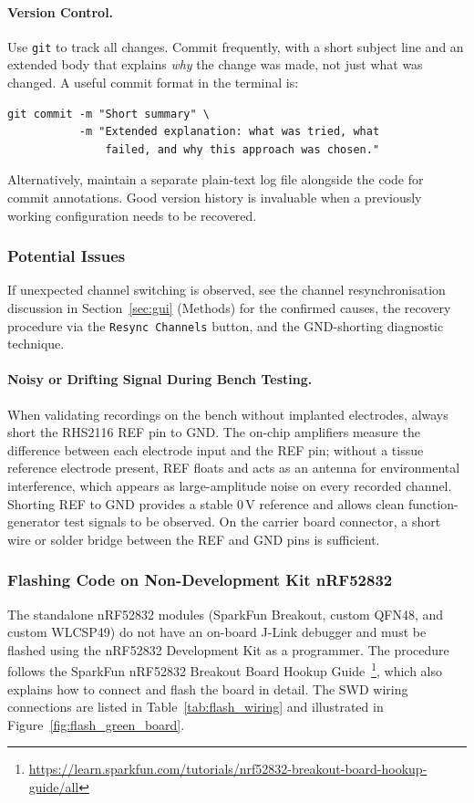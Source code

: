 \paragraph{Version Control.}
Use \texttt{git} to track all changes. Commit frequently, with a short subject line
and an extended body that explains \emph{why} the change was made, not just what
was changed. A useful commit format in the terminal is:
\begin{lstlisting}[numbers=none,frame=none]
git commit -m "Short summary" \
           -m "Extended explanation: what was tried, what
               failed, and why this approach was chosen."
\end{lstlisting}
Alternatively, maintain a separate plain-text log file alongside the code for
commit annotations. Good version history is invaluable when a previously working
configuration needs to be recovered.

\subsubsection{Potential Issues}
If unexpected channel switching is observed, see the channel resynchronisation
discussion in Section~\ref{sec:gui} (Methods) for the confirmed causes, the
recovery procedure via the \texttt{Resync Channels} button, and the GND-shorting
diagnostic technique.

\paragraph{Noisy or Drifting Signal During Bench Testing.}
When validating recordings on the bench without implanted electrodes, always
short the RHS2116 REF pin to GND. The on-chip amplifiers measure the difference
between each electrode input and the REF pin; without a tissue reference
electrode present, REF floats and acts as an antenna for environmental
interference, which appears as large-amplitude noise on every recorded channel.
Shorting REF to GND provides a stable 0\,V reference and allows clean
function-generator test signals to be observed. On the carrier board connector,
a short wire or solder bridge between the REF and GND pins is sufficient.

\subsubsection{Flashing Code on Non-Development Kit nRF52832}
\label{app:flash_ndk}

The standalone nRF52832 modules (SparkFun Breakout, custom QFN48, and custom WLCSP49)
do not have an on-board J-Link debugger and must be flashed using the nRF52832
Development Kit as a programmer. The procedure follows the SparkFun nRF52832 Breakout
Board Hookup Guide~\cite{sparkfun_hookup_guide}\footnote{\url{https://learn.sparkfun.com/tutorials/nrf52832-breakout-board-hookup-guide/all}},
which also explains how to connect and flash the board in detail. The SWD wiring
connections are listed in Table~\ref{tab:flash_wiring} and illustrated in
Figure~\ref{fig:flash_green_board}.

